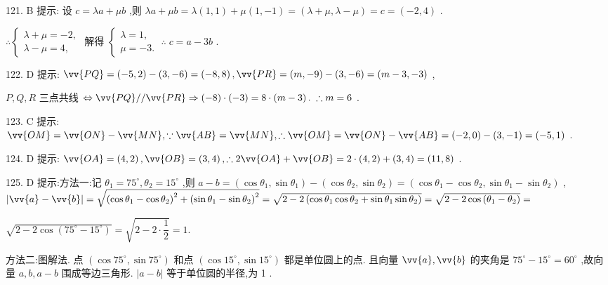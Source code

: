 121. B 提示: 设 $c = {\lambda a} + {\mu b}$ ,则 ${\lambda a} + {\mu b} = \lambda \left( {1,1}\right)  + \mu \left( {1, - 1}\right)  = \left( {\lambda  + \mu ,\lambda  - \mu }\right)  = c = \left( {-2,4}\right)$ .

$\therefore \left\{  \begin{array}{l} \lambda  + \mu  =  - 2, \\  \lambda  - \mu  = 4, \end{array}\right.$ 解得 $\left\{  {\begin{array}{l} \lambda  = 1, \\  \mu  =  - 3. \end{array}\;\therefore \;c = a - {3b}}\right.$ .

122. D 提示: $\vv{PQ} = \left( {-5,2}\right)  - \left( {3, - 6}\right)  = \left( {-8,8}\right) ,\vv{PR} = \left( {m, - 9}\right)  - \left( {3, - 6}\right)  = \left( {m - 3, - 3}\right)$ ,

$P,Q,R$ 三点共线 $\Leftrightarrow  \vv{PQ}//\vv{PR} \Rightarrow  \left( {-8}\right)  \cdot  \left( {-3}\right)  = 8 \cdot  \left( {m - 3}\right) .\;\therefore m = 6$ .

123. C 提示: $\vv{OM} = \vv{ON} - \vv{MN},\because \vv{AB} = \vv{MN},\therefore \vv{OM} = \vv{ON} - \vv{AB} = \left( {-2,0}\right)  - \left( {3, - 1}\right)  = \left( {-5,1}\right)$ .

124. D 提示: $\vv{OA} = \left( {4,2}\right) ,\vv{OB} = \left( {3,4}\right) ,\therefore 2\vv{OA} + \vv{OB} = 2 \cdot  \left( {4,2}\right)  + \left( {3,4}\right)  = \left( {{11},8}\right)$ .

125. D 提示:方法一:记 ${\theta }_{1} = {75}^{ \circ  },{\theta }_{2} = {15}^{ \circ  }$ ,则 $a - b = \left( {\cos {\theta }_{1},\sin {\theta }_{1}}\right)  - \left( {\cos {\theta }_{2},\sin {\theta }_{2}}\right)  = \left( {\cos {\theta }_{1} - \cos {\theta }_{2},\sin {\theta }_{1} - \sin {\theta }_{2}}\right)$ , $\left| {\vv{a} - \vv{b}}\right|  = \sqrt{{\left( \cos {\theta }_{1} - \cos {\theta }_{2}\right) }^{2} + {\left( \sin {\theta }_{1} - \sin {\theta }_{2}\right) }^{2}} = \sqrt{2 - 2\left( {\cos {\theta }_{1}\cos {\theta }_{2} + \sin {\theta }_{1}\sin {\theta }_{2}}\right) } = \sqrt{2 - 2\cos \left( {{\theta }_{1} - {\theta }_{2}}\right) } =$

$\sqrt{2 - 2\cos \left( {{75}^{ \circ  } - {15}^{ \circ  }}\right) } = \sqrt{2 - 2 \cdot  \dfrac{1}{2}} = 1.$

方法二:图解法. 点 $\left( {\cos {75}^{ \circ  },\sin {75}^{ \circ  }}\right)$ 和点 $\left( {\cos {15}^{ \circ  },\sin {15}^{ \circ  }}\right)$ 都是单位圆上的点. 且向量 $\vv{a},\vv{b}$ 的夹角是 ${75}^{ \circ  } - {15}^{ \circ  } = {60}^{ \circ  }$ ,故向量 $a,b,a - b$ 围成等边三角形. $\left| {a - b}\right|$ 等于单位圆的半径,为 1 .

